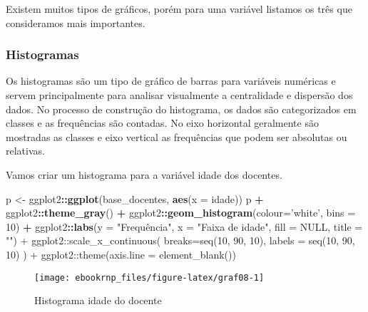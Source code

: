 \documentclass[11pt,]{style/krantz}
\makeatletter
\newenvironment{Shaded}{\begin{snugshade}}{\end{snugshade}}
\newcommand{\DataTypeTok}[1]{\textcolor[rgb]{0.13,0.29,0.53}{#1}}
\newcommand{\DecValTok}[1]{\textcolor[rgb]{0.00,0.00,0.81}{#1}}
\newcommand{\KeywordTok}[1]{\textcolor[rgb]{0.13,0.29,0.53}{\textbf{#1}}}
\newcommand{\NormalTok}[1]{#1}
\newcommand{\OperatorTok}[1]{\textcolor[rgb]{0.81,0.36,0.00}{\textbf{#1}}}
\newcommand{\StringTok}[1]{\textcolor[rgb]{0.31,0.60,0.02}{#1}}
\newenvironment{kframe}{%
\medskip{}
\setlength{\fboxsep}{.8em}
 \def\at@end@of@kframe{}%
 \ifinner\ifhmode%
  \def\at@end@of@kframe{\end{minipage}}%
  \begin{minipage}{\columnwidth}%
 \fi\fi%
 \def\FrameCommand##1{\hskip\@totalleftmargin \hskip-\fboxsep
 \colorbox{shadecolor}{##1}\hskip-\fboxsep
     \hskip-\linewidth \hskip-\@totalleftmargin \hskip\columnwidth}%
 \MakeFramed {\advance\hsize-\width
   \@totalleftmargin\z@ \linewidth\hsize
   \@setminipage}}%
 {\par\unskip\endMakeFramed%
 \at@end@of@kframe}
\renewenvironment{Shaded}{\begin{kframe}}{\end{kframe}}
\theoremstyle{definition}
\theoremstyle{definition}
\theoremstyle{definition}
\theoremstyle{remark}
\let\BeginKnitrBlock\begin \let\EndKnitrBlock\end
\makeatother
\begin{document}
Existem muitos tipos de gráficos, porém para uma variável listamos os três que consideramos mais importantes.

\hypertarget{histogramas}{%
\subsubsection{Histogramas}\label{histogramas}}

Os histogramas são um tipo de gráfico de barras para variáveis numéricas e servem principalmente para analisar visualmente a centralidade e dispersão dos dados. No processo de construção do histograma, os dados são categorizados em classes e as frequências são contadas. No eixo horizontal geralmente são mostradas as classes e eixo vertical as frequências que podem ser absolutas ou relativas.

\BeginKnitrBlock{example}
\protect\hypertarget{exm:unnamed-chunk-76}{}{\label{exm:unnamed-chunk-76} }Vamos criar um histograma para a variável idade dos docentes.
\EndKnitrBlock{example}

\begin{Shaded}
\begin{Highlighting}[]
\NormalTok{p <-}\StringTok{ }\NormalTok{ggplot2}\OperatorTok{::}\KeywordTok{ggplot}\NormalTok{(base_docentes, }\KeywordTok{aes}\NormalTok{(}\DataTypeTok{x =}\NormalTok{ idade))}
\NormalTok{p }\OperatorTok{+}\StringTok{ }\NormalTok{ggplot2}\OperatorTok{::}\KeywordTok{theme_gray}\NormalTok{() }\OperatorTok{+}
\StringTok{  }\NormalTok{ggplot2}\OperatorTok{::}\KeywordTok{geom_histogram}\NormalTok{(}\DataTypeTok{colour=}\StringTok{'white'}\NormalTok{, }\DataTypeTok{bins =} \DecValTok{10}\NormalTok{) }\OperatorTok{+}
\StringTok{  }\NormalTok{ggplot2}\OperatorTok{::}\KeywordTok{labs}\NormalTok{(}\DataTypeTok{y =} \StringTok{"Frequência", x = "}\NormalTok{Faixa de idade}\StringTok{", fill = NULL, title = "") +}
\StringTok{    ggplot2::scale_x_continuous(}
\StringTok{      breaks=seq(10, 90, 10),}
\StringTok{      labels = seq(10, 90, 10)}
\StringTok{    ) +}
\StringTok{  ggplot2::theme(axis.line = element_blank())}
\end{Highlighting}
\end{Shaded}

\begin{figure}[H]

{\centering \texttt{[image: ebookrnp\_files/figure-latex/graf08-1]}

}

\caption{Histograma idade do docente}\label{fig:graf08}
\end{figure}
\end{document}
